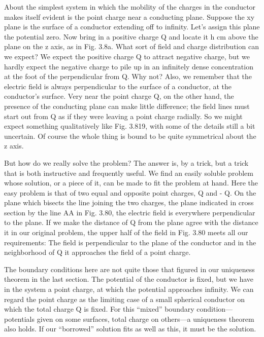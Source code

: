 About the simplest system in which the mobility of the charges in
the conductor makes itself evident is the point charge near a conducting
plane. Suppose the xy plane is the surface of a conductor
extending off to infinity. Let's assign this plane the potential zero.
Now bring in a positive charge Q and locate it h cm above the plane
on the z axis, as in Fig. 3.8a. What sort of field and charge distribution
can we expect? We expect the positive charge Q to attract negative
charge, but we hardly expect the negative charge to pile up in an
infinitely dense concentration at the foot of the perpendicular from Q.
Why not? Also, we remember that the electric field is always perpendicular
to the surface of a conductor, at the conductor's surface.
Very near the point charge Q, on the other hand, the presence of the
conducting plane can make little difference; the field lines must start
out from Q as if they were leaving a point charge radially. So we
might expect something qualitatively like Fig. 3.819, with some of the
details still a bit uncertain. Of course the whole thing is bound to
be quite symmetrical about the z axis.

But how do we really solve the problem? The answer is, by a trick,
but a trick that is both instructive and frequently useful. We find an
easily soluble problem whose solution, or a piece of it, can be made
to fit the problem at hand. Here the easy problem is that of two equal
and opposite point charges, Q and - Q. On the plane which bisects
the line joining the two charges, the plane indicated in cross section
by the line AA in Fig. 3.80, the electric field is everywhere perpendicular
to the plane. If we make the distance of Q from the plane
agree with the distance it in our original problem, the upper half of
the field in Fig. 3.80 meets all our requirements: The field is perpendicular
to the plane of the conductor and in the neighborhood of Q
it approaches the field of a point charge.

The boundary conditions here are not quite those that figured in
our uniqueness theorem in the last section. The potential of the conductor
is fixed, but we have in the system a point charge, at which
the potential approaches infinity. We can regard the point charge
as the limiting case of a small spherical conductor on which the total
charge Q is fixed. For this ``mixed'' boundary condition---potentials
given on some surfaces, total charge on others---a uniqueness
theorem also holds. If our ``borrowed'' solution fits as well as this,
it must be the solution.

